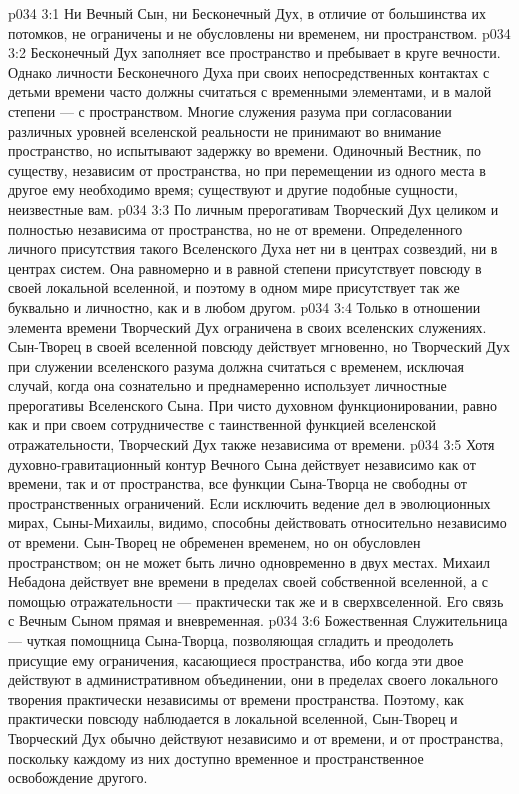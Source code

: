 \vs p034 3:1 Ни Вечный Сын, ни Бесконечный Дух, в отличие от большинства их потомков, не ограничены и не обусловлены ни временем, ни пространством.
\vs p034 3:2 Бесконечный Дух заполняет все пространство и пребывает в круге вечности. Однако личности Бесконечного Духа при своих непосредственных контактах с детьми времени часто должны считаться с временными элементами, и в малой степени --- с пространством. Многие служения разума при согласовании различных уровней вселенской реальности не принимают во внимание пространство, но испытывают задержку во времени. Одиночный Вестник, по существу, независим от пространства, но при перемещении из одного места в другое ему необходимо время; существуют и другие подобные сущности, неизвестные вам.
\vs p034 3:3 \pc По личным прерогативам Творческий Дух целиком и полностью независима от пространства, но не от времени. Определенного личного присутствия такого Вселенского Духа нет ни в центрах созвездий, ни в центрах систем. Она равномерно и в равной степени присутствует повсюду в своей локальной вселенной, и поэтому в одном мире присутствует так же буквально и личностно, как и в любом другом.
\vs p034 3:4 Только в отношении элемента времени Творческий Дух ограничена в своих вселенских служениях. Сын\hyp{}Творец в своей вселенной повсюду действует мгновенно, но Творческий Дух при служении вселенского разума должна считаться с временем, исключая случай, когда она сознательно и преднамеренно использует личностные прерогативы Вселенского Сына. При чисто духовном функционировании, равно как и при своем сотрудничестве с таинственной функцией вселенской отражательности, Творческий Дух также независима от времени.
\vs p034 3:5 \pc Хотя духовно\hyp{}гравитационный контур Вечного Сына действует независимо как от времени, так и от пространства, все функции Сына\hyp{}Творца не свободны от пространственных ограничений. Если исключить ведение дел в эволюционных мирах, Сыны\hyp{}Михаилы, видимо, способны действовать относительно независимо от времени. Сын\hyp{}Творец не обременен временем, но он обусловлен пространством; он не может быть лично одновременно в двух местах. Михаил Небадона действует вне времени в пределах своей собственной вселенной, а с помощью отражательности --- практически так же и в сверхвселенной. Его связь с Вечным Сыном прямая и вневременная.
\vs p034 3:6 Божественная Служительница --- чуткая помощница Сына\hyp{}Творца, позволяющая сгладить и преодолеть присущие ему ограничения, касающиеся пространства, ибо когда эти двое действуют в административном объединении, они в пределах своего локального творения практически независимы от времени  пространства. Поэтому, как практически повсюду наблюдается в локальной вселенной, Сын\hyp{}Творец и Творческий Дух обычно действуют независимо и от времени, и от пространства, поскольку каждому из них доступно временное и пространственное освобождение другого.
